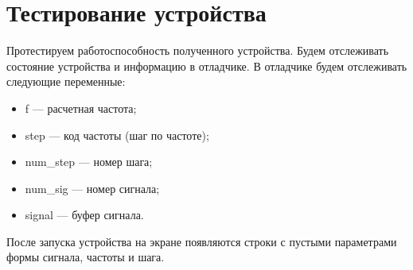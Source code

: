 \section{Тестирование устройства}
	
	Протестируем работоспособность полученного устройства. Будем отслеживать состояние устройства и информацию в отладчике. В отладчике будем отслеживать следующие переменные:
	\begin{itemize}
	\item f --- расчетная частота;
	\item step --- код частоты (шаг по частоте);
	\item num\_step --- номер шага;
	\item num\_sig --- номер сигнала;
	\item signal --- буфер сигнала.
	\end{itemize}		
	
	После запуска устройства на экране появляются строки с пустыми параметрами формы сигнала, частоты и шага. 

